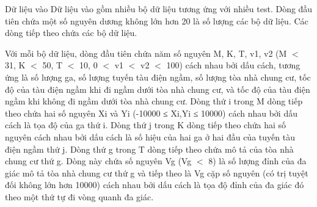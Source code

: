 Dữ liệu vào
Dữ liệu vào gồm nhiều bộ dữ liệu tương ứng với nhiều test. Dòng đầu tiên chứa một số nguyên dương không lớn hơn 20 là số lượng các bộ dữ liệu. Các dòng tiếp theo chứa các bộ dữ liệu.  

   Với mỗi bộ dữ liệu, dòng đầu tiên chứa năm số nguyên M, K, T, v1, v2 (M $<$ 31, K $<$ 50, T $<$ 10, 0 $<$ v1 $<$ v2 $<$ 100) cách nhau bởi dấu cách, tương ứng là số lượng ga, số lượng tuyến tàu điện ngầm, số lượng tòa nhà chung cư, tốc độ của tàu điện ngầm khi đi ngầm dưới tòa nhà chung cư, và tốc độ của tàu điện ngầm khi không đi ngầm dưới tòa nhà chung cư. Dòng thứ i trong M dòng tiếp theo chứa hai số nguyên Xi và Yi (-10000 ≤ Xi,Yi ≤ 10000) cách nhau bởi dấu cách là tọa độ của ga thứ i. Dòng thứ j trong K dòng tiếp theo chứa hai số nguyên cách nhau bởi dấu cách là số hiệu của hai ga ở hai đầu của tuyến tàu điện ngầm thứ j. Dòng thứ g trong T dòng tiếp theo chứa mô tả của tòa nhà chung cư thứ g. Dòng này chứa số nguyên Vg (Vg $<$ 8) là số lượng đỉnh của đa giác mô tả tòa nhà chung cư thứ g và tiếp theo là Vg cặp số nguyên (có trị tuyệt đối không lớn hơn 10000) cách nhau bởi dấu cách là tọa độ đỉnh của đa giác đó theo một thứ tự đi vòng quanh đa giác.